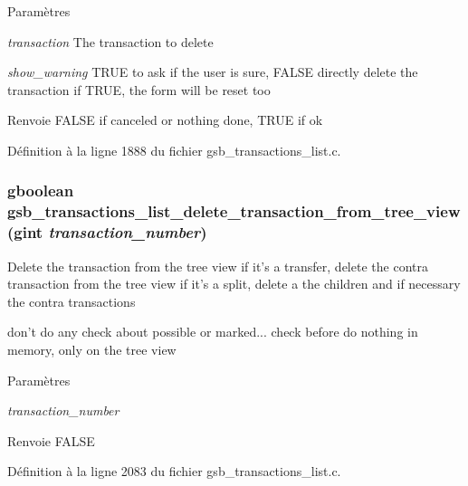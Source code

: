 \begin{DoxyParams}{Paramètres}
\item[{\em transaction}]The transaction to delete \item[{\em show\_\-warning}]TRUE to ask if the user is sure, FALSE directly delete the transaction if TRUE, the form will be reset too\end{DoxyParams}
\begin{DoxyReturn}{Renvoie}
FALSE if canceled or nothing done, TRUE if ok 
\end{DoxyReturn}


Définition à la ligne 1888 du fichier gsb\_\-transactions\_\-list.c.

\subsubsection[{gsb\_\-transactions\_\-list\_\-delete\_\-transaction\_\-from\_\-tree\_\-view}]{\setlength{\rightskip}{0pt plus 5cm}gboolean gsb\_\-transactions\_\-list\_\-delete\_\-transaction\_\-from\_\-tree\_\-view (gint {\em transaction\_\-number})}\label{gsb__transactions__list_8c_af4607ecfa510ff666ad6f3a12b898e4f}
Delete the transaction from the tree view if it's a transfer, delete the contra transaction from the tree view if it's a split, delete a the children and if necessary the contra transactions

don't do any check about possible or marked... check before do nothing in memory, only on the tree view


\begin{DoxyParams}{Paramètres}
\item[{\em transaction\_\-number}]\end{DoxyParams}
\begin{DoxyReturn}{Renvoie}
FALSE 
\end{DoxyReturn}


Définition à la ligne 2083 du fichier gsb\_\-transactions\_\-list.c.

